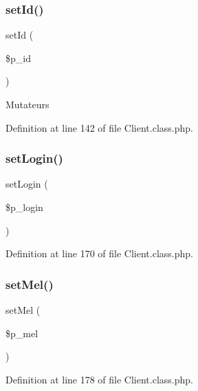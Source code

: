 \mbox{\label{class_client_ab2fff0fc655f96b6e5f4fcc294c49eee}} 
\subsubsection{\texorpdfstring{set\+Id()}{setId()}}
{\footnotesize\ttfamily set\+Id (\begin{DoxyParamCaption}\item[{}]{\$p\+\_\+id }\end{DoxyParamCaption})}

Mutateurs 

Definition at line 142 of file Client.\+class.\+php.

\mbox{\label{class_client_a9462cf04d3320cc2529d79e5648e61de}} 
\subsubsection{\texorpdfstring{set\+Login()}{setLogin()}}
{\footnotesize\ttfamily set\+Login (\begin{DoxyParamCaption}\item[{}]{\$p\+\_\+login }\end{DoxyParamCaption})}



Definition at line 170 of file Client.\+class.\+php.

\mbox{\label{class_client_ab0cbd09d000eb72455e26e25900a3f39}} 
\subsubsection{\texorpdfstring{set\+Mel()}{setMel()}}
{\footnotesize\ttfamily set\+Mel (\begin{DoxyParamCaption}\item[{}]{\$p\+\_\+mel }\end{DoxyParamCaption})}



Definition at line 178 of file Client.\+class.\+php.

\mbox{\label{class_client_a7b29388deb98bceec710261439234709}} 
